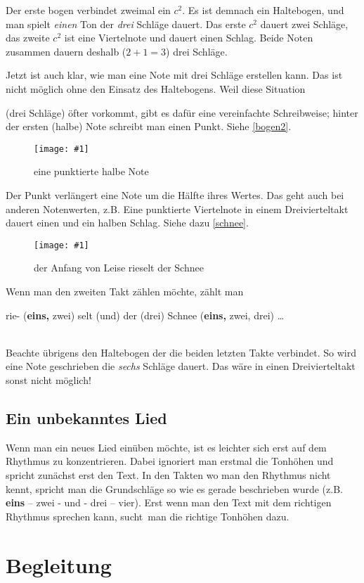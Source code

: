 \documentclass[10pt,a4paper,twoside]{report}
\newcommand{\comment}[1]{
	\marginpar{
		\textsf{#1}
	}
}
\newcommand{\image}[4]{
	\begin{figure}[!ht]
		\centering
		\texttt{[image: \#1]}
		\caption{#2}
		\label{#3}
	\end{figure}
}
\newcommand{\myquote}[1]{
	\hspace{15mm}
	\parbox{100mm}{
		#1
	}
	\ \\
}
\begin{document}
Der erste bogen verbindet zweimal ein $c^2$. Es ist demnach ein Haltebogen, und man
spielt \emph{einen} Ton der \emph{drei} Schläge dauert. Das erste $c^2$ dauert zwei 
Schläge, das zweite $c^2$ ist eine Viertelnote und dauert einen Schlag. Beide Noten
zusammen dauern deshalb ($2 + 1 = 3$) drei Schläge.

Jetzt ist auch klar, wie man eine Note mit drei Schläge erstellen kann. Das ist 
nicht möglich ohne den Einsatz des Haltebogens. Weil diese Situation
\comment{Punkt verlängert um die Hälfte} (drei Schläge)
öfter vorkommt, gibt es dafür eine vereinfachte Schreibweise; hinter der ersten (halbe)
Note schreibt man einen Punkt. Siehe \autoref{bogen2}.
\image{lilypond/bogen2.png}{eine punktierte halbe Note}{bogen2}{6}

Der Punkt verlängert eine Note um die Hälfte ihres Wertes. Das geht auch bei anderen 
Notenwerten, z.B. Eine punktierte Viertelnote in einem Dreivierteltakt dauert einen und 
ein halben Schlag. Siehe dazu \autoref{schnee}.
\image{lilypond/schnee.png}{der Anfang von \glqq Leise rieselt der Schnee\grqq }{schnee}{7}

Wenn man den zweiten Takt zählen möchte, zählt man

\myquote{
	rie- {\footnotesize (\textbf{eins,} zwei)} selt {\footnotesize (und)} der 
	{\footnotesize (drei)} Schnee {\footnotesize (\textbf{eins,} zwei, drei)}
	\dots
}

Beachte übrigens den Haltebogen der die beiden letzten Takte verbindet. So wird
eine Note geschrieben die \emph{sechs} Schläge dauert. Das wäre in einen Dreivierteltakt sonst nicht möglich!

\section{Ein unbekanntes Lied}
Wenn man ein neues Lied einüben möchte, ist es leichter sich erst auf dem Rhythmus zu 
konzentrieren. Dabei ignoriert man erstmal die Tonhöhen und spricht zunächst erst 
den Text. In den Takten wo man den Rhythmus nicht kennt, spricht man die Grundschläge
so wie es gerade beschrieben wurde (z.B. \textbf{eins} -- zwei - und - drei -- vier).
Erst wenn man den Text mit dem richtigen Rhythmus sprechen kann, \glqq sucht\grqq\ man 
die richtige Tonhöhen dazu.

\chapter{Begleitung}
\end{document}
